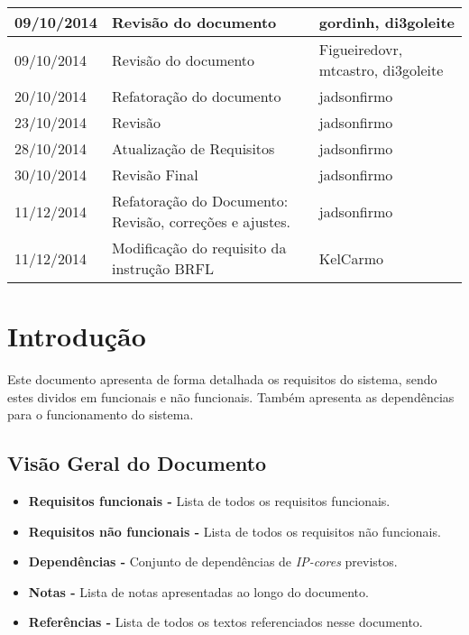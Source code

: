 \documentclass{article}
\begin{document}
\begin{table}[ht]
\begin{tabular}[pos]{|m{2cm} | m{7.2cm} | m{3.8cm}|}
      \small 09/10/2014 & \small Revisão do documento & \small gordinh, di3goleite \\ \hline
      \small 09/10/2014 & \small Revisão do documento & \small Figueiredovr, mtcastro, di3goleite \\ \hline
      \small 20/10/2014 & \small Refatoração do documento & \small jadsonfirmo \\ \hline
      \small 23/10/2014 & \small Revisão & \small jadsonfirmo \\ \hline
      \small 28/10/2014 & \small Atualização de Requisitos & \small jadsonfirmo \\ \hline
      \small 30/10/2014 & \small Revisão Final & \small jadsonfirmo \\ \hline
      \small 11/12/2014 & \small Refatoração do Documento: Revisão, correções e ajustes. & \small jadsonfirmo \\ \hline
      \small 11/12/2014 & \small Modificação do requisito da instrução BRFL & \small KelCarmo \\ \hline
    \end{tabular}
  \end{table}

\newpage

\tableofcontents
\newpage

\section{Introdução}
	Este documento apresenta de forma detalhada os requisitos do sistema, sendo estes dividos em funcionais e não funcionais. Também apresenta as dependências para o funcionamento do sistema.

\subsection{Visão Geral do Documento}
  \begin{itemize}
   \item \textbf{Requisitos funcionais -} Lista de todos os requisitos funcionais.
   \item \textbf{Requisitos não funcionais -} Lista de todos os requisitos não funcionais.
   \item \textbf{Dependências -} Conjunto de dependências de \textit{IP-cores} previstos.
   \item \textbf{Notas -} Lista de notas apresentadas ao longo do documento.
   \item \textbf{Referências -} Lista de todos os textos referenciados nesse documento.
  \end{itemize}
\end{document}

